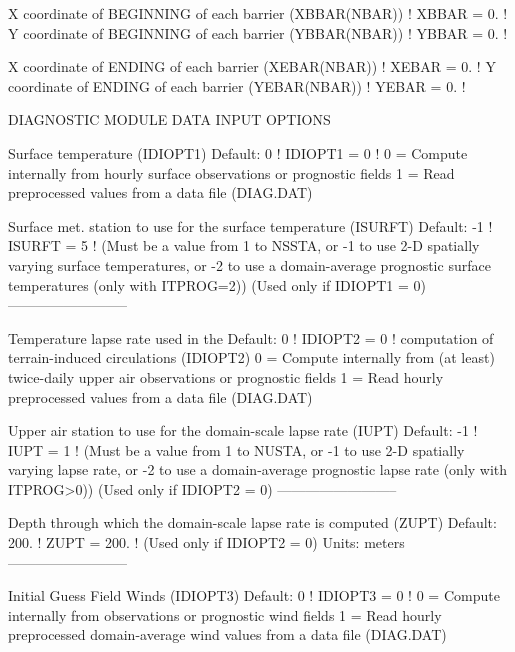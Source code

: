 \documentclass[a4paper,10pt]{article}
\begin{document}
          X coordinate of BEGINNING
          of each barrier (XBBAR(NBAR))      ! XBBAR = 0. !
          Y coordinate of BEGINNING
          of each barrier (YBBAR(NBAR))      ! YBBAR = 0. !

          X coordinate of ENDING
          of each barrier (XEBAR(NBAR))      ! XEBAR = 0. !
          Y coordinate of ENDING
          of each barrier (YEBAR(NBAR))      ! YEBAR = 0. !


    DIAGNOSTIC MODULE DATA INPUT OPTIONS

       Surface temperature (IDIOPT1)         Default: 0      ! IDIOPT1 =  0  !
          0 = Compute internally from
              hourly surface observations or prognostic fields
          1 = Read preprocessed values from
              a data file (DIAG.DAT)

          Surface met. station to use for
          the surface temperature (ISURFT)   Default: -1    ! ISURFT =  5  !
          (Must be a value from 1 to NSSTA,
           or -1 to use 2-D spatially varying
              surface temperatures,
           or -2 to use a domain-average prognostic
              surface temperatures (only with ITPROG=2))
          (Used only if IDIOPT1 = 0)
          --------------------------

       Temperature lapse rate used in the    Default: 0     ! IDIOPT2 =  0  !
          computation of terrain-induced
          circulations (IDIOPT2)
          0 = Compute internally from (at least) twice-daily
              upper air observations or prognostic fields
          1 = Read hourly preprocessed values
              from a data file (DIAG.DAT)

          Upper air station to use for
          the domain-scale lapse rate (IUPT) Default: -1    ! IUPT   =  1  !
          (Must be a value from 1 to NUSTA,
           or -1 to use 2-D spatially varying lapse rate,
           or -2 to use a domain-average prognostic
              lapse rate (only with ITPROG>0))
          (Used only if IDIOPT2 = 0)
          --------------------------

          Depth through which the domain-scale
          lapse rate is computed (ZUPT)      Default: 200.  ! ZUPT = 200. !
          (Used only if IDIOPT2 = 0)         Units: meters
          --------------------------

       Initial Guess Field Winds
       (IDIOPT3)                             Default: 0     ! IDIOPT3 =  0  !
          0 = Compute internally from
              observations or prognostic wind fields
          1 = Read hourly preprocessed domain-average wind values
              from a data file (DIAG.DAT)
\end{document}
